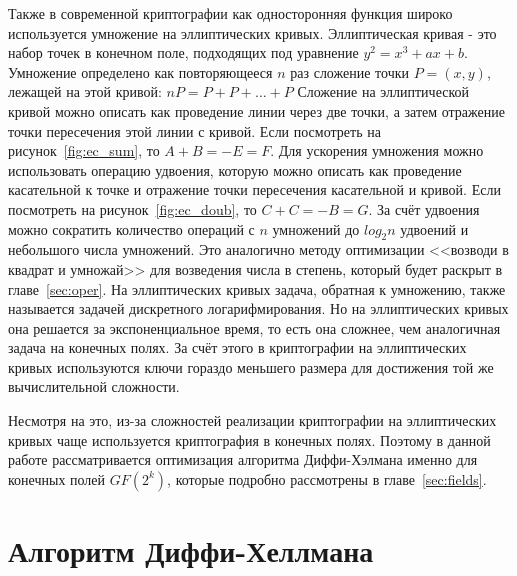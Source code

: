 \documentclass[times,specification,annotation]{itmo-student-thesis}
\begin{document}
Также в современной криптографии как односторонняя функция широко используется умножение на эллиптических кривых.
Эллиптическая кривая - это набор точек в конечном поле, подходящих под уравнение $y^2=x^3+ax+b$.
Умножение определено как повторяющееся $n$ раз сложение точки $P=(x,y)$, лежащей на этой кривой: $nP=P+P+\dots+P$
Сложение на эллиптической кривой можно описать как проведение линии через две точки, а затем отражение точки пересечения этой линии с кривой.
Если посмотреть на рисунок~\ref{fig:ec_sum}, то $A+B=-E=F$.
Для ускорения умножения можно использовать операцию удвоения, которую можно описать как проведение касательной к точке и
отражение точки пересечения касательной и кривой.
Если посмотреть на рисунок~\ref{fig:ec_doub}, то $C+C=-B=G$.
За счёт удвоения можно сократить количество операций с $n$ умножений до $log_2 n$ удвоений и небольшого числа умножений.
Это аналогично методу оптимизации <<возводи в квадрат и умножай>> для возведения числа в степень, который будет раскрыт в главе~\ref{sec:oper}.
На эллиптических кривых задача, обратная к умножению, также называется задачей дискретного логарифмирования.
Но на эллиптических кривых она решается за экспоненциальное время, то есть она сложнее, чем аналогичная задача на конечных полях.
За счёт этого в криптографии на эллиптических кривых используются ключи гораздо меньшего размера для достижения той же вычислительной сложности.\par
Несмотря на это, из-за сложностей реализации криптографии на эллиптических кривых чаще используется криптография в конечных полях.
Поэтому в данной работе рассматривается оптимизация алгоритма Диффи-Хэлмана именно для конечных полей $GF(2^k)$, которые подробно рассмотрены в главе~\ref{sec:fields}.

\section{Алгоритм Диффи-Хеллмана}\label{sec:dhke}
\end{document}
